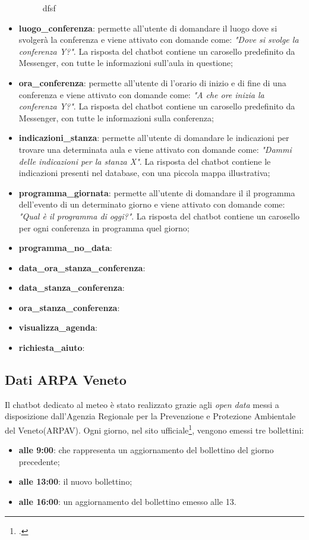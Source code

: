 \begin{itemize}
\begin{figure}[h]
		\caption{dfsf}
	\end{figure}
	\item \textbf{luogo\_conferenza}: permette all'utente di domandare il luogo dove si svolgerà la conferenza e viene attivato con domande come: \emph{"Dove si svolge la conferenza Y?"}. La risposta del \gls{chatbot} contiene un carosello predefinito da Messenger, con tutte le informazioni sull'aula in questione;
	\item \textbf{ora\_conferenza}: permette all'utente di l'orario di inizio e di fine di una conferenza e viene attivato con domande come: \emph{"A che ore inizia la conferenza Y?"}. La risposta del \gls{chatbot} contiene un carosello predefinito da Messenger, con tutte le informazioni sulla conferenza;
	\item \textbf{indicazioni\_stanza}: permette all'utente di domandare le indicazioni per trovare una determinata aula e viene attivato con domande come: \emph{"Dammi delle indicazioni per la stanza X"}. La risposta del \gls{chatbot} contiene le indicazioni presenti nel database, con una piccola mappa illustrativa;
	\item \textbf{programma\_giornata}: permette all'utente di domandare il il programma dell'evento di un determinato giorno e viene attivato con domande come: \emph{"Qual è il programma di oggi?"}. La risposta del \gls{chatbot} contiene un carosello per ogni conferenza in programma quel giorno;
	\item \textbf{programma\_no\_data}:
	\item \textbf{data\_ora\_stanza\_conferenza}:
	\item \textbf{data\_stanza\_conferenza}:
	\item \textbf{ora\_stanza\_conferenza}:
	\item \textbf{visualizza\_agenda}:
	\item \textbf{richiesta\_aiuto}:
\end{itemize}

\subsection{Dati ARPA Veneto}
Il \gls{chatbot} dedicato al meteo è stato realizzato grazie agli \emph{open data} messi a disposizione dall'Agenzia Regionale per la Prevenzione e Protezione Ambientale del Veneto(ARPAV). Ogni giorno, nel sito ufficiale\footcite{arpav}, vengono emessi tre bollettini:
\begin{itemize}
	\item \textbf{alle 9:00}: che rappresenta un aggiornamento del bollettino del giorno precedente;
	\item \textbf{alle 13:00}: il nuovo bollettino;
	\item \textbf{alle 16:00}: un aggiornamento del bollettino emesso alle 13.
\end{itemize} 

